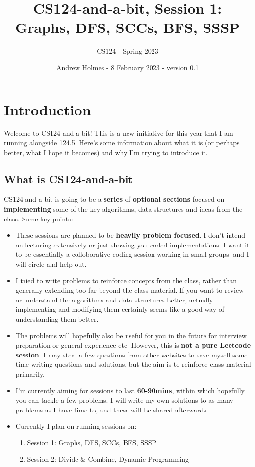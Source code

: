 \documentclass{article}
\title{CS124-and-a-bit, Session 1: Graphs, DFS, SCCs, BFS, SSSP}
\author{CS124 - Spring 2023 }
\date{Andrew Holmes - 8 February 2023 - version 0.1}
\begin{document}
\maketitle
\tableofcontents

\newpage
\section{Introduction}

Welcome to CS124-and-a-bit! This is a new initiative for this year that I am running alongside 124.5. Here's some information about what it is (or perhaps better, what I hope it becomes) and why I'm trying to introduce it.

\subsection{What is CS124-and-a-bit}

CS124-and-a-bit is going to be a \textbf{series} of \textbf{optional sections} focused on \textbf{implementing} some of the key algorithms, data structures and ideas from the class. Some key points:

\begin{itemize}
    \item These sessions are planned to be \textbf{heavily problem focused}. I don't intend on lecturing extensively or just showing you coded implementations. I want it to be essentially a colloborative coding session working in small groups, and I will circle and help out.
    \item I tried to write problems to reinforce concepts from the class, rather than generally extending too far beyond the class material. If you want to review or understand the algorithms and data structures better, actually implementing and modifying them certainly seems like a good way of understanding them better.
    \item The problems will hopefully also be useful for you in the future for interview preparation or general experience etc. However, this is \textbf{not a pure Leetcode session}. I may steal a few questions from other websites to save myself some time writing questions and solutions, but the aim is to reinforce class material primarily.
    \item I'm currently aiming for sessions to last \textbf{60-90mins}, within which hopefully you can tackle a few problems. I will write my own solutions to as many problems as I have time to, and these will be shared afterwards.
    \item Currently I plan on running sessions on:
    \begin{enumerate}
        \item Session 1: Graphs, DFS, SCCs, BFS, SSSP
        \item Session 2: Divide & Combine, Dynamic Programming
    \end{enumerate}
\end{itemize}
\end{document}
